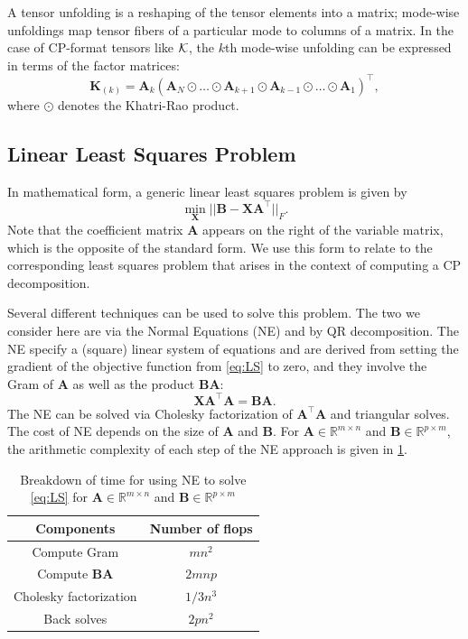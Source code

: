 \documentclass{article}
\newcommand{\mat}[1]{\mathbf{#1}}
\newcommand{\T}[2][]{#1{\mathbf{\cal{#2}}}} 						%
\begin{document}
A tensor unfolding is a reshaping of the tensor elements into a matrix; mode-wise unfoldings map tensor fibers of a particular mode to columns of a matrix.
In the case of CP-format tensors like $\T{K}$, the $k$th mode-wise unfolding can be expressed in terms of the factor matrices:
$$\mat{K}_{(k)} = \mat{A}_k (\mat{A}_N \odot \dots \odot \mat{A}_{k+1} \odot \mat{A}_{k-1} \odot \dots \odot \mat{A}_1)^\top,$$
where $\odot$ denotes the Khatri-Rao product.

\subsection{Linear Least Squares Problem}
\label{sec:LS}

In mathematical form, a generic linear least squares problem is given by 
\begin{equation}
\label{eq:LS}
\min_{\mat{X}}||\mat{B} - \mat{X}\mat{A}^\top||_{F}.
\end{equation}
Note that the coefficient matrix $\mat{A}$ appears on the right of the variable matrix, which is the opposite of the standard form.
We use this form to relate to the corresponding least squares problem that arises in the context of computing a CP decomposition.

Several different techniques can be used to solve this problem.
The two we consider here are via the Normal Equations (NE) and by QR decomposition.
The NE specify a (square) linear system of equations and are derived from setting the gradient of the objective function from \cref{eq:LS} to zero, and they involve the Gram of $\mat{A}$ as well as the product $\mat{B}\mat{A}$:
\begin{equation}
\label{eq:NE}
\mat{X}\mat{A}^\top\mat{A} = \mat{B}\mat{A}.
\end{equation}
The NE can be solved via Cholesky factorization of $\mat{A}^\top\mat{A}$ and triangular solves.
The cost of NE depends on the size of $\mat{A}$ and $\mat{B}$. 
For $\mat{A} \in \mathbb{R}^{m \times n}$ and $\mat{B} \in \mathbb{R}^{p \times m}$, the arithmetic complexity of each step of the NE approach is given in \cref{tab:NE-time}.
\begin{table}[!ht]
  \centering
  \begin{tabular}{|c|c|}
    \hline
    Components & Number of flops\\
    \hline
    Compute Gram & $mn^2$ \\
    Compute $\mat{B}\mat{A}$ & $2mnp$\\
    Cholesky factorization & $1/3n^3$ \\
    Back solves & $2pn^2$ \\
    \hline
  \end{tabular}
  \caption{Breakdown of time for using NE to solve \cref{eq:LS} for $\mat{A} \in \mathbb{R}^{m \times n}$ and $\mat{B} \in \mathbb{R}^{p \times m}$}
  \label{tab:NE-time}
\end{table}
\end{document}
